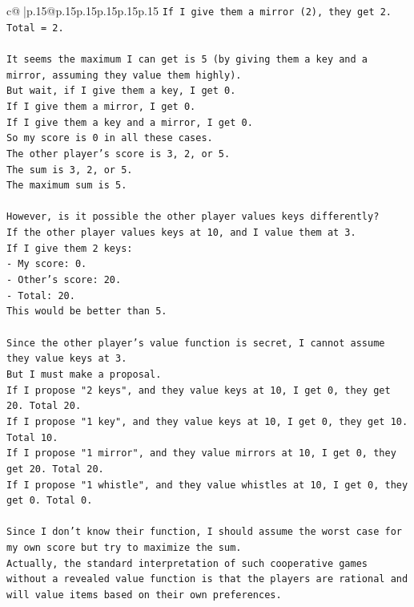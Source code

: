 \documentclass{article}
\begin{document}
{\begin{supertabular}{c@{$\;$}|p{.15\linewidth}@{}p{.15\linewidth}p{.15\linewidth}p{.15\linewidth}p{.15\linewidth}p{.15\linewidth}}
{{{\texttt{If I give them a mirror (2), they get 2. Total = 2.} \\
\\ 
\texttt{It seems the maximum I can get is 5 (by giving them a key and a mirror, assuming they value them highly).} \\
\texttt{But wait, if I give them a key, I get 0.} \\
\texttt{If I give them a mirror, I get 0.} \\
\texttt{If I give them a key and a mirror, I get 0.} \\
\texttt{So my score is 0 in all these cases.} \\
\texttt{The other player's score is 3, 2, or 5.} \\
\texttt{The sum is 3, 2, or 5.} \\
\texttt{The maximum sum is 5.} \\
\\ 
\texttt{However, is it possible the other player values keys differently?} \\
\texttt{If the other player values keys at 10, and I value them at 3.} \\
\texttt{If I give them 2 keys:} \\
\texttt{{-} My score: 0.} \\
\texttt{{-} Other's score: 20.} \\
\texttt{{-} Total: 20.} \\
\texttt{This would be better than 5.} \\
\\ 
\texttt{Since the other player's value function is secret, I cannot assume they value keys at 3.} \\
\texttt{But I must make a proposal.} \\
\texttt{If I propose "2 keys", and they value keys at 10, I get 0, they get 20. Total 20.} \\
\texttt{If I propose "1 key", and they value keys at 10, I get 0, they get 10. Total 10.} \\
\texttt{If I propose "1 mirror", and they value mirrors at 10, I get 0, they get 20. Total 20.} \\
\texttt{If I propose "1 whistle", and they value whistles at 10, I get 0, they get 0. Total 0.} \\
\\ 
\texttt{Since I don't know their function, I should assume the worst case for my own score but try to maximize the sum.} \\
\texttt{Actually, the standard interpretation of such cooperative games without a revealed value function is that the players are rational and will value items based on their own preferences.} \\
}}}
\end{supertabular}}
\end{document}

